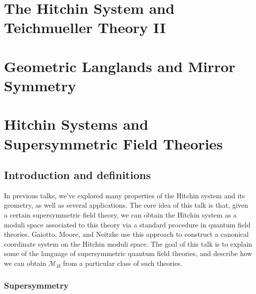 \documentclass[oneside,english]{amsbook}
\numberwithin{section}{chapter}
\numberwithin{equation}{section}
\numberwithin{figure}{section}
\theoremstyle{plain}
\theoremstyle{definition}
\theoremstyle{remark}
\theoremstyle{definition}
\theoremstyle{definition}
\theoremstyle{plain}
\begin{document}
\chapter{The Hitchin System and Teichmueller Theory II}


\chapter{Geometric Langlands and Mirror Symmetry}

\chapter{Hitchin Systems and Supersymmetric Field Theories}

\section{Introduction and definitions}

In previous talks, we've explored many properties of the Hitchin system
and its geometry, as well as several applications. The core idea of
this talk is that, given a certain supersymmetric field theory, we
can obtain the Hitchin system as a moduli space associated to this
theory via a standard procedure in quantum field theories. Gaiotto,
Moore, and Neitzke \cite{GMN} use this approach to construct a canonical
coordinate system on the Hitchin moduli space. The goal of this talk
is to explain some of the language of supersymmetric quantum field
theories, and describe how we can obtain $\mathcal{M}_{H}$ from a
particular class of such theories.


\subsection{Supersymmetry}
\end{document}
